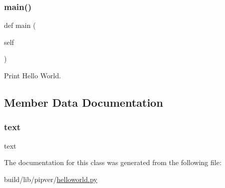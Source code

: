 \subsubsection{\texorpdfstring{main()}{main()}\hspace{0.1cm}{\footnotesize\ttfamily [2/2]}}
{\footnotesize\ttfamily def main (\begin{DoxyParamCaption}\item[{}]{self }\end{DoxyParamCaption})}



Print Hello World. 



\subsection{Member Data Documentation}
\mbox{\label{classpipver_1_1helloworld_1_1HelloWorld_af575f17e6be3f269b86b041a60560dbf}} 
\subsubsection{\texorpdfstring{text}{text}}
{\footnotesize\ttfamily text}



The documentation for this class was generated from the following file\+:\begin{DoxyCompactItemize}
\item 
build/lib/pipver/\hyperlink{build_2lib_2pipver_2helloworld_8py}{helloworld.\+py}\end{DoxyCompactItemize}

